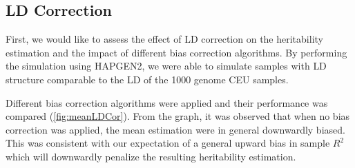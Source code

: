 \documentclass[12pt]{scrbook}
\begin{document}
\subsection{LD Correction}
First, we would like to assess the effect of \gls{LD} correction on the heritability estimation and the impact of different bias correction algorithms. 
By performing the simulation using HAPGEN2, we were able to simulate samples with \gls{LD} structure comparable to the \gls{LD} of the 1000 genome \gls{CEU} samples.

Different bias correction algorithms were applied and their performance was compared (\cref{fig:meanLDCor}).
From the graph, it was observed that when no bias correction was applied, the mean estimation were in general downwardly biased.
This was consistent with our expectation of a general upward bias in sample $R^2$ which will downwardly penalize the resulting heritability estimation.
\end{document}
